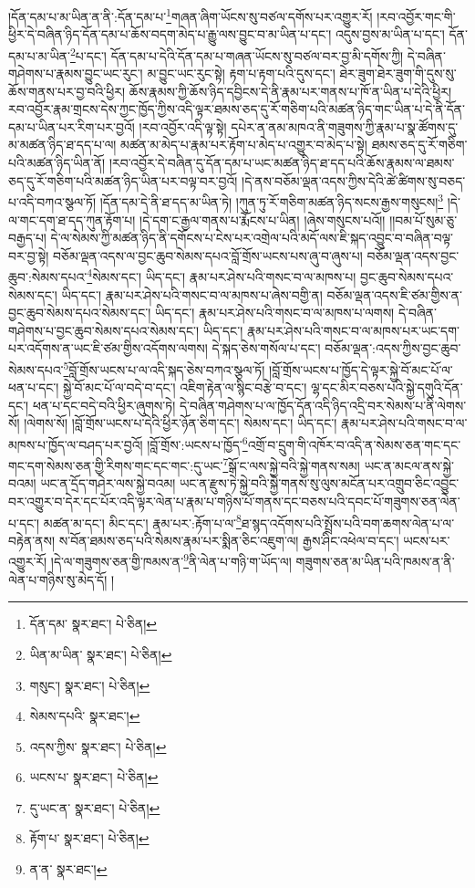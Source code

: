 །དོན་དམ་པ་མ་ཡིན་ན་ནི་:དོན་དམ་པ་\footnote{དོན་དམ་  སྣར་ཐང་།  པེ་ཅིན། }གཞན་ཞིག་ཡོངས་སུ་བཙལ་དགོས་པར་འགྱུར་རོ། །རབ་འབྱོར་གང་གི་ཕྱིར་དེ་བཞིན་ཉིད་དོན་དམ་པ་ཆོས་བདག་མེད་པ་རྒྱུ་ལས་བྱུང་བ་མ་ཡིན་པ་དང་། འདུས་བྱས་མ་ཡིན་པ་དང་། དོན་དམ་པ་མ་ཡིན་\footnote{ཡིན་མ་ཡིན་  སྣར་ཐང་།  པེ་ཅིན། }པ་དང་། དོན་དམ་པ་དེའི་དོན་དམ་པ་གཞན་ཡོངས་སུ་བཙལ་བར་བྱ་མི་དགོས་ཀྱི། དེ་བཞིན་གཤེགས་པ་རྣམས་བྱུང་ཡང་རུང་། མ་བྱུང་ཡང་རུང་སྟེ། རྟག་པ་རྟག་པའི་དུས་དང་། ཐེར་ཟུག་ཐེར་ཟུག་གི་དུས་སུ་ཆོས་གནས་པར་བྱ་བའི་ཕྱིར། ཆོས་རྣམས་ཀྱི་ཆོས་ཉིད་དབྱིངས་དེ་ནི་རྣམ་པར་གནས་པ་ཁོ་ན་ཡིན་པ་དེའི་ཕྱིར། རབ་འབྱོར་རྣམ་གྲངས་དེས་ཀྱང་ཁྱོད་ཀྱིས་འདི་ལྟར་ཐམས་ཅད་དུ་རོ་གཅིག་པའི་མཚན་ཉིད་གང་ཡིན་པ་དེ་ནི་དོན་དམ་པ་ཡིན་པར་རིག་པར་བྱའོ། །རབ་འབྱོར་འདི་ལྟ་སྟེ། དཔེར་ན་ནམ་མཁའ་ནི་གཟུགས་ཀྱི་རྣམ་པ་སྣ་ཚོགས་དུ་མ་མཚན་ཉིད་ཐ་དད་པ་ལ། མཚན་མ་མེད་པ་རྣམ་པར་རྟོག་པ་མེད་པ་འགྱུར་བ་མེད་པ་སྟེ། ཐམས་ཅད་དུ་རོ་གཅིག་པའི་མཚན་ཉིད་ཡིན་ནོ། །རབ་འབྱོར་དེ་བཞིན་དུ་དོན་དམ་པ་ཡང་མཚན་ཉིད་ཐ་དད་པའི་ཆོས་རྣམས་ལ་ཐམས་ཅད་དུ་རོ་གཅིག་པའི་མཚན་ཉིད་ཡིན་པར་བལྟ་བར་བྱའོ། །དེ་ནས་བཅོམ་ལྡན་འདས་ཀྱིས་དེའི་ཚེ་ཚིགས་སུ་བཅད་པ་འདི་བཀའ་སྩལ་ཏོ། །དོན་དམ་དེ་ནི་ཐ་དད་མ་ཡིན་ཏེ། །ཀུན་ཏུ་རོ་གཅིག་མཚན་ཉིད་སངས་རྒྱས་གསུངས།\footnote{གསུང་།  སྣར་ཐང་།  པེ་ཅིན། } །དེ་ལ་གང་དག་ཐ་དད་ཀུན་རྟོག་པ། །དེ་དག་ང་རྒྱལ་གནས་པ་རྨོངས་པ་ཡིན། །ཞེས་གསུངས་པའོ།། །།བམ་པོ་སུམ་ཅུ་བརྒྱད་པ། དེ་ལ་སེམས་ཀྱི་མཚན་ཉིད་ནི་དགོངས་པ་ངེས་པར་འགྲེལ་པའི་མདོ་ལས་ཇི་སྐད་འབྱུང་བ་བཞིན་བལྟ་བར་བྱ་སྟེ། བཅོམ་ལྡན་འདས་ལ་བྱང་ཆུབ་སེམས་དཔའ་བློ་གྲོས་ཡངས་པས་ཞུ་བ་ཞུས་པ། བཅོམ་ལྡན་འདས་བྱང་ཆུབ་:སེམས་དཔའ་\footnote{སེམས་དཔའི་  སྣར་ཐང་། }སེམས་དང་། ཡིད་དང་། རྣམ་པར་ཤེས་པའི་གསང་བ་ལ་མཁས་པ། བྱང་ཆུབ་སེམས་དཔའ་སེམས་དང་། ཡིད་དང་། རྣམ་པར་ཤེས་པའི་གསང་བ་ལ་མཁས་པ་ཞེས་བགྱི་ན། བཅོམ་ལྡན་འདས་ཇི་ཙམ་གྱིས་ན་བྱང་ཆུབ་སེམས་དཔའ་སེམས་དང་། ཡིད་དང་། རྣམ་པར་ཤེས་པའི་གསང་བ་ལ་མཁས་པ་ལགས། དེ་བཞིན་གཤེགས་པ་བྱང་ཆུབ་སེམས་དཔའ་སེམས་དང་། ཡིད་དང་། རྣམ་པར་ཤེས་པའི་གསང་བ་ལ་མཁས་པར་ཡང་དག་པར་འདོགས་ན་ཡང་ཇི་ཙམ་གྱིས་འདོགས་ལགས། དེ་སྐད་ཅེས་གསོལ་པ་དང་། བཅོམ་ལྡན་:འདས་ཀྱིས་བྱང་ཆུབ་སེམས་དཔའ་\footnote{འདས་ཀྱིས་  སྣར་ཐང་།  པེ་ཅིན། }བློ་གྲོས་ཡངས་པ་ལ་འདི་སྐད་ཅེས་བཀའ་སྩལ་ཏོ། །བློ་གྲོས་ཡངས་པ་ཁྱོད་དེ་ལྟར་སྐྱེ་བོ་མང་པོ་ལ་ཕན་པ་དང་། སྐྱེ་བོ་མང་པོ་ལ་བདེ་བ་དང་། འཇིག་རྟེན་ལ་སྙིང་བརྩེ་བ་དང་། ལྷ་དང་མིར་བཅས་པའི་སྐྱེ་དགུའི་དོན་དང་། ཕན་པ་དང་བདེ་བའི་ཕྱིར་ཞུགས་ཏེ། དེ་བཞིན་གཤེགས་པ་ལ་ཁྱོད་དོན་འདི་ཉིད་འདྲི་བར་སེམས་པ་ནི་ལེགས་སོ། །ལེགས་སོ། །བློ་གྲོས་ཡངས་པ་དེའི་ཕྱིར་ཉོན་ཅིག་དང་། སེམས་དང་། ཡིད་དང་། རྣམ་པར་ཤེས་པའི་གསང་བ་ལ་མཁས་པ་ཁྱོད་ལ་བཤད་པར་བྱའོ། །བློ་གྲོས་:ཡངས་པ་ཁྱོད་\footnote{ཡངས་པ་  སྣར་ཐང་།  པེ་ཅིན། }འགྲོ་བ་དྲུག་གི་འཁོར་བ་འདི་ན་སེམས་ཅན་གང་དང་གང་དག་སེམས་ཅན་གྱི་རིགས་གང་དང་གང་:དུ་ཡང་\footnote{དུ་ཡང་ན་  སྣར་ཐང་།  པེ་ཅིན། }སྒོ་ང་ལས་སྐྱེ་བའི་སྐྱེ་གནས་སམ། ཡང་ན་མངལ་ནས་སྐྱེ་བའམ། ཡང་ན་དྲོད་གཤེར་ལས་སྐྱེ་བའམ། ཡང་ན་རྫུས་ཏེ་སྐྱེ་བའི་སྐྱེ་གནས་སུ་ལུས་མངོན་པར་འགྲུབ་ཅིང་འབྱུང་བར་འགྱུར་བ་དེར་དང་པོར་འདི་ལྟར་ལེན་པ་རྣམ་པ་གཉིས་པོ་གནས་དང་བཅས་པའི་དབང་པོ་གཟུགས་ཅན་ལེན་པ་དང་། མཚན་མ་དང་། མིང་དང་། རྣམ་པར་:རྟོག་པ་ལ་\footnote{རྟོག་པ་  སྣར་ཐང་།  པེ་ཅིན། }ཐ་སྙད་འདོགས་པའི་སྤྲོས་པའི་བག་ཆགས་ལེན་པ་ལ་བརྟེན་ནས། ས་བོན་ཐམས་ཅད་པའི་སེམས་རྣམ་པར་སྨིན་ཅིང་འཇུག་ལ། རྒྱས་ཤིང་འཕེལ་བ་དང་། ཡངས་པར་འགྱུར་རོ། །དེ་ལ་གཟུགས་ཅན་གྱི་ཁམས་ན་\footnote{ན་ན་  སྣར་ཐང་། }ནི་ལེན་པ་གཉི་ག་ཡོད་ལ། གཟུགས་ཅན་མ་ཡིན་པའི་ཁམས་ན་ནི་ལེན་པ་གཉིས་སུ་མེད་དོ། །
